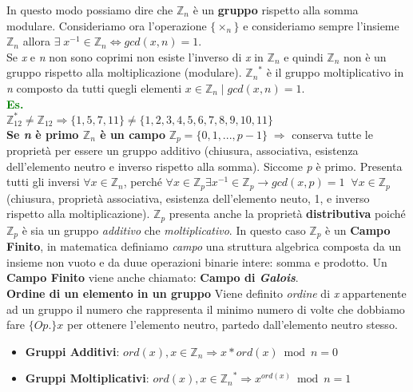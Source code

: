 In questo modo possiamo dire che $\mathbb{Z}_n$ è un \textbf{gruppo} rispetto alla somma modulare.
Consideriamo ora l'operazione $\{{\times}_n\}$ e consideriamo sempre l'insieme $\mathbb{Z}_n$ allora $\exists \; x^{-1} \in \mathbb{Z}_n \iff gcd(x, n) = 1$. \\
Se \textit{x} e \textit{n} non sono coprimi non esiste l'inverso di \textit{x} in $\mathbb{Z}_n$ e quindi $\mathbb{Z}_n$ non è un gruppo rispetto alla moltiplicazione (modulare). ${\mathbb{Z}_n}^{*}$ è il gruppo moltiplicativo in \textit{n} composto da tutti quegli elementi $x \in \mathbb{Z}_n\;|\; gcd(x, n) = 1$.
\\ \newline
\textcolor{green}{\textbf{Es.}} \\
$\mathbb{Z}_{12}^* \ne \mathbb{Z}_{12} \Rightarrow \{1, 5, 7, 11\} \neq \{1, 2, 3, 4, 5, 6, 7, 8, 9, 10, 11\}$
\\ \newline
\textbf{Se \textit{n} è primo $\mathbb{Z}_n$ è un campo}
\newline
$\mathbb{Z}_p = \{0, 1, ..., p - 1\}\;\Rightarrow$ conserva tutte le proprietà per essere un gruppo additivo (chiusura, associativa, esistenza dell'elemento neutro e inverso rispetto alla somma). 
\newline
Siccome \textit{p} è primo. Presenta tutti gli inversi $\forall x \in \mathbb{Z}_n$, perché $\forall x \in \mathbb{Z}_p \exists x^{-1} \in \mathbb{Z}_p \rightarrow gcd(x, p) = 1 \;\; \forall x \in \mathbb{Z}_p$ (chiusura, proprietà associativa, esistenza dell'elemento neuto, 1, e inverso rispetto alla moltiplicazione).
\newline
$\mathbb{Z}_p$ presenta anche la proprietà \textbf{distributiva} poiché $\mathbb{Z}_p$ è sia un gruppo \textit{additivo} che \textit{moltiplicativo}. In questo caso $\mathbb{Z}_p$ è un \textbf{Campo Finito}, in matematica definiamo \textit{campo} una struttura algebrica composta da un insieme non vuoto e da duue operazioni binarie intere: somma e prodotto. Un \textbf{Campo Finito} viene anche chiamato: \textbf{Campo di \textit{Galois}}.
\\ \newline
\textbf{Ordine di un elemento in un gruppo}
\newline
Viene definito \textit{ordine} di \textit{x} appartenente ad un gruppo il numero che rappresenta il minimo numero di volte che dobbiamo fare $\{Op.\} x$ per ottenere l'elemento neutro, partedo dall'elemento neutro stesso.
\begin{itemize}
    \item \textbf{Gruppi Additivi}: $ord(x), x \in \mathbb{Z}_n \Rightarrow x * ord(x) \bmod n = 0$
    \item \textbf{Gruppi Moltiplicativi}: $ord(x), x \in {\mathbb{Z}_n}^* \Rightarrow x^{ord(x)} \bmod n = 1$ 
\end{itemize}
